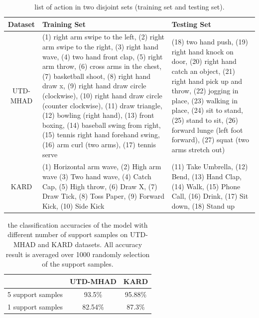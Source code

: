 \documentclass{bmvc2k}
\begin{document}
\begin{table}[htb]
	\begin{center}
		\begin{tabular}{|c|p{4.8cm}|p{4cm}|}
			
			\hline
			Dataset & Training Set  & Testing Set \\
			\hline\hline
			UTD-MHAD & (1) right arm swipe to the left, (2) right arm swipe to the right, (3) right hand wave, (4) two hand front clap, (5) right arm throw, (6) cross arms in the chest, (7) basketball shoot, (8) right hand draw x, (9) right hand draw circle (clockwise), (10) right hand draw circle (counter clockwise), (11) draw triangle, (12) bowling (right hand), (13) front boxing, (14) baseball swing from right, (15) tennis right hand forehand swing, (16) arm curl (two arms), (17) tennis serve & (18) two hand push, (19) right hand knock on door, (20) right hand catch an object, (21) right hand pick up and throw, (22) jogging in place, (23) walking in place, (24) sit to stand, (25) stand to sit, (26) forward lunge (left foot forward), (27) squat (two arms stretch out)\\
			\hline
			KARD & (1) Horizontal arm wave, (2) High arm wave
			(3) Two hand wave, (4) Catch Cap, (5) High throw, (6) Draw X, (7) Draw Tick, (8) Toss Paper, (9) Forward Kick, (10) Side Kick
			& (11) Take Umbrella, (12) Bend, (13) Hand Clap, (14) Walk, (15) Phone Call, (16) Drink, (17) Sit down, (18) Stand up \\
			\hline
		\end{tabular}	
	\end{center}
	\caption{ list of action in two disjoint sets (training set and testing set). }	
	\label{tab:3}
\end{table}
\begin{table}[htbp]
	\begin{center}	
		\begin{tabular}{|c|c|c|}
			\hline
			& UTD-MHAD & KARD\\
			\hline\hline
			5 support samples & 93.5\% & 95.88\% \\
			1 support samples & 82.54\%
			& 87.3\%\\
			\hline
		\end{tabular}	
	\end{center}
	\caption{ the classification accuracies of the model with different number of support samples on UTD-MHAD and KARD datasets. All accuracy result is averaged over 1000 randomly selection of the support samples. }	
	\label{tab:4}
\end{table}
\end{document}
